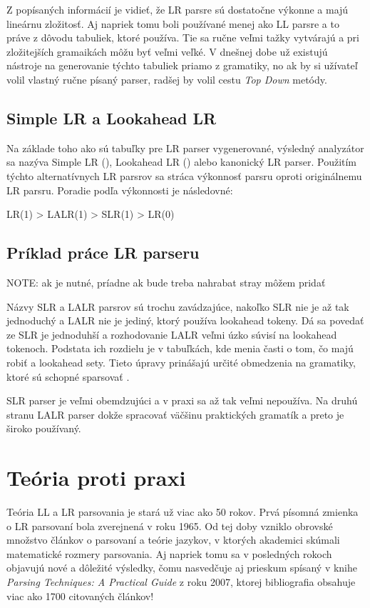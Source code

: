 Z popísaných informácií je vidieť, že LR parsre sú dostatočne výkonne a majú lineárnu zložitosť. Aj napriek tomu boli používané menej ako LL parsre a to práve z dôvodu tabuliek, ktoré používa. Tie sa ručne veľmi tažky vytvárajú a pri zložitejších gramaikách môžu byť veľmi veľké. V dnešnej dobe už existujú nástroje na generovanie týchto tabuliek priamo z gramatiky, no ak by si užívateľ volil vlastný ručne písaný parser, radšej by volil cestu \textit{Top Down} metódy.

\subsection{Simple LR a Lookahead LR}
Na základe toho ako sú tabuľky pre LR parser vygenerované, výsledný analyzátor sa nazýva Simple LR (\textbf{}), Lookahead LR (\textbf{}) alebo kanonický LR parser. Použitím týchto alternatívnych LR parsrov sa stráca výkonnosť parsru oproti originálnemu LR parsru. Poradie podľa výkonnosti je následovné:
\begin{center}
 LR(1) > LALR(1) > SLR(1) > LR(0) \cite{grune2007parsing}
\end{center}

\subsection{Príklad práce LR parseru}
NOTE: ak je nutné, príadne ak bude treba nahrabat stray môžem pridať

Názvy SLR a LALR parsrov sú trochu zavádzajúce, nakoľko SLR nie je až tak jednoduchý a LALR nie je jediný, ktorý používa lookahead tokeny. Dá sa povedať ze SLR je jednoduhší a rozhodovanie LALR veľmi úzko súvisí na lookahead tokenoch. Podstata ich rozdielu je v tabuľkách, kde menia časti o tom, čo majú robiť a lookahead sety. Tieto úpravy prinášajú určité obmedzenia na gramatiky, ktoré sú schopné sparsovať \cite{tomassetti:parsing}.

SLR parser je veľmi obemdzujúci a v praxi sa až tak veľmi nepoužíva. Na druhú stranu LALR parser dokže spracovať väčšinu praktických gramatík a preto je široko používaný.

\section{Teória proti praxi}
Teória LL a LR parsovania je stará už viac ako 50 rokov. Prvá písomná zmienka o LR parsovaní \cite{LR} bola zverejnená v roku 1965. Od tej doby vzniklo obrovské množstvo  článkov o parsovaní a teórie jazykov, v ktorých akademici skúmali matematické rozmery parsovania. Aj napriek tomu sa v posledných rokoch objavujú nové a dôležité výsledky, čomu nasvedčuje aj prieskum spísaný v knihe \textit{Parsing Techniques: A Practical Guide} \cite{grune2007parsing} z roku 2007, ktorej bibliografia obsahuje viac ako 1700 citovaných článkov! \cite{haberman:hard_parsing}

